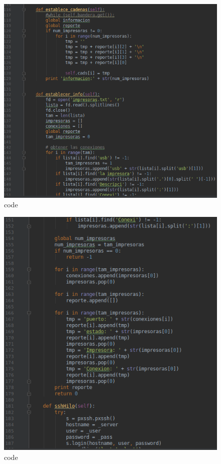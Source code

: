 \FloatBarrier
\begin{figure}[htbp!]
		\centering
			\includegraphics[width=.9\textwidth]{images/s4}
		\caption{code}
		\label{image:s4}
\end{figure}
\FloatBarrier

\FloatBarrier
\begin{figure}[htbp!]
		\centering
			\includegraphics[width=.9\textwidth]{images/s5}
		\caption{code}
		\label{image:s5}
\end{figure}
\FloatBarrier

